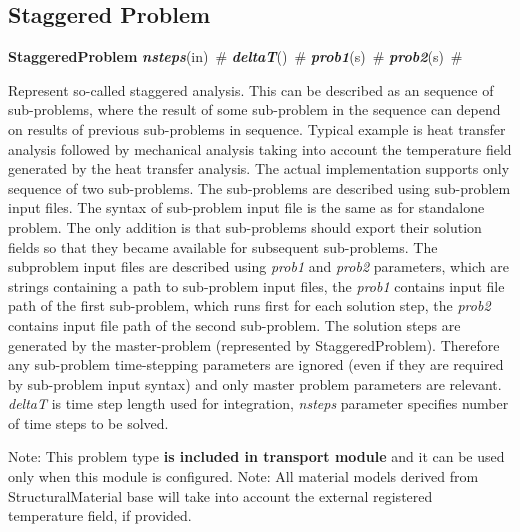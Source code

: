 \documentclass[draft]{article}
\newcommand{\param}[1]{{\em #1}}
\newcommand{\keywordnotype}[1]{\mbox{{\it{\bf{#1}}}}}
\newcommand{\keyword}[2]{\mbox{{\keywordnotype{#1}\tiny (#2)}}}
\newcommand{\entKeywordInst}[1]{\mbox{{\bf{{#1}}}}}
\newcommand{\field}[2]{\mbox{\keyword{#1}{#2}~\#}}
\begin{document}
\subsection{Staggered Problem}
\label{staggeredproblem}
\entKeywordInst{StaggeredProblem} \field{nsteps}{in}
\field{deltaT}{} \field{prob1}{s} \field{prob2}{s} 

Represent so-called staggered analysis. This can be described as an
sequence of sub-problems, where the result of some sub-problem in the
sequence can depend on results of previous sub-problems in sequence.
Typical example is heat transfer analysis followed by mechanical
analysis taking into account the temperature field generated by the
heat transfer analysis.
The actual implementation supports only sequence of two sub-problems.
The sub-problems are described using sub-problem input files. The
syntax of sub-problem input file is the same as for standalone
problem. The only addition is that sub-problems should export their
solution fields so that they became available for subsequent
sub-problems. The subproblem input files are described using
\param{prob1} and \param{prob2} parameters, which are strings
containing a path to sub-problem input files, the \param{prob1}
contains input file path of the first sub-problem, which runs first
for each solution step, the \param{prob2} contains input file path of
the second sub-problem. The solution steps are generated by the
master-problem (represented by StaggeredProblem). Therefore any
sub-problem time-stepping parameters are ignored (even if they are
required by sub-problem input syntax) and only master problem
parameters are relevant. \param{deltaT} is time step length used for
integration, \param{nsteps} parameter specifies
number of time steps to be solved.

Note: This problem type {\bf is included in transport module} and it
can be used only when this module is configured.
Note: All material models derived from StructuralMaterial base will
take into account the external registered temperature field, if
provided.
\end{document}
